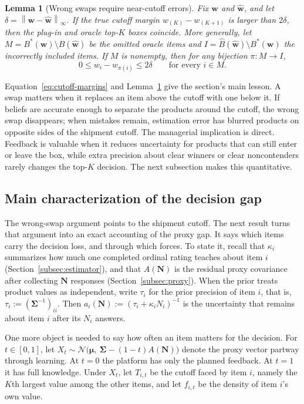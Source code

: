 \documentclass[11pt]{article}
\newtheorem{lemma}[theorem]{Lemma}
\theoremstyle{definition}
\theoremstyle{remark}
\newcommand{\1}{\mathbf{1}}
\newcommand{\w}{\mathbf{w}}
\newcommand{\norm}[1]{\left\lVert #1\right\rVert}
\newcommand{\bmu}{\boldsymbol{\mu}}
\newcommand{\bSigma}{\boldsymbol{\Sigma}}
\newcommand{\N}{\mathbf{N}}
\begin{document}
\begin{lemma}[Wrong swaps require near-cutoff errors]
\label{lem:wrong-swap-band}
Fix \(\w\) and \(\hat{\w}\), and let
\(\delta=\norm{\w-\hat{\w}}_\infty\). If the true cutoff margin
\(w_{(K)}-w_{(K+1)}\) is larger than \(2\delta\), then the plug-in and
oracle top-\(K\) boxes coincide. More generally, let
\(M=B^*(\w)\setminus \hat B(\hat{\w})\) be the omitted oracle items and
\(I=\hat B(\hat{\w})\setminus B^*(\w)\) the incorrectly included items. If
\(M\) is nonempty, then for any bijection \(\pi:M\to I\),
\[
0\le w_i-w_{\pi(i)}\le 2\delta
\qquad\text{for every }i\in M.
\]
\end{lemma}

Equation~\eqref{eq:cutoff-margins} and
Lemma~\ref{lem:wrong-swap-band} give the section's main lesson. A swap
matters when it replaces an item above the cutoff with one below it. If
beliefs are accurate enough to separate the products around the cutoff,
the wrong swap disappears; when mistakes remain, estimation error has
blurred products on opposite sides of the shipment cutoff. The
managerial implication is direct. Feedback is valuable when it reduces
uncertainty for products that can still enter or leave the box, while
extra precision about clear winners or clear noncontenders rarely
changes the top-\(K\) decision. The next subsection makes this
quantitative.

\subsection[Main characterization of the decision gap]{Main characterization of the decision gap}
\label{subsec:bound-N}

The wrong-swap argument points to the shipment cutoff. The next result
turns that argument into an exact accounting of the proxy gap. It says
which items carry the decision loss, and through which forces. To state it, recall
that \(\kappa_i\) summarizes how much one completed ordinal rating
teaches about item \(i\) (Section~\ref{subsec:estimator}), and that
\(A(\N)\) is the residual proxy covariance after collecting \(\N\)
responses (Section~\ref{subsec:proxy}). When the prior treats product
values as independent, write \(\tau_i\) for the prior precision of item
\(i\), that is, \(\tau_i:=(\bSigma^{-1})_{ii}\). Then
\(a_i(\N):=(\tau_i+\kappa_i N_i)^{-1}\) is the uncertainty that remains about item \(i\) after its \(N_i\) answers.

One more object is needed to say how often an item matters for the decision. For
\(t\in[0,1]\), let \(X_t\sim\mathcal N\big(\bmu,\
\bSigma-(1-t)A(\N)\big)\) denote the proxy vector partway through
learning. At \(t=0\) the platform has only the planned feedback. At
\(t=1\) it has full knowledge.
Under \(X_t\), let \(T_{i,t}\) be the cutoff faced by item \(i\),
namely the \(K\)th largest value among the other items, and let
\(f_{i,t}\) be the density of item \(i\)'s own value.
\end{document}
